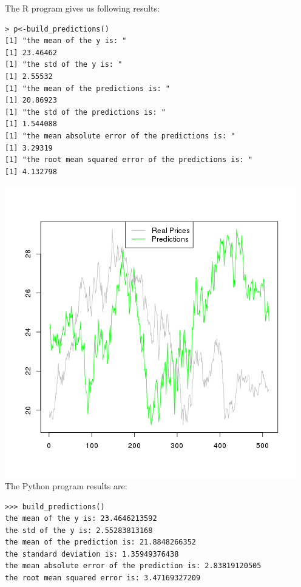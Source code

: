 \documentclass{article}
\begin{document}
The R program gives us following results:
\begin{verbatim}
> p<-build_predictions()
[1] "the mean of the y is: "
[1] 23.46462
[1] "the std of the y is: "
[1] 2.55532
[1] "the mean of the predictions is: "
[1] 20.86923
[1] "the std of the predictions is: "
[1] 1.544088
[1] "the mean absolute error of the predictions is: "
[1] 3.29319
[1] "the root mean squared error of the predictions is: "
[1] 4.132798
\end{verbatim}
\includegraphics[scale=0.75]{RPredicitions.png}
The Python program results are:
\begin{verbatim}
>>> build_predictions()
the mean of the y is: 23.4646213592
the std of the y is: 2.55283813168
the mean of the prediction is: 21.8848266352
the standard deviation is: 1.35949376438
the mean absolute error of the prediction is: 2.83819120505
the root mean squared error is: 3.47169327209
\end{verbatim}
\end{document}
